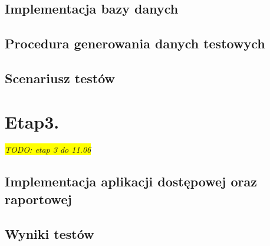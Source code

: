 \documentclass{article}
\newcommand{\todo}[1]{
	\colorbox{yellow} {{\color{red}
	\emph {TODO: #1}
}}}
\begin{document}
\subsection{Implementacja bazy danych}
\subsection{Procedura generowania danych testowych}
\subsection{Scenariusz testów}
\section{Etap3. \label{s3}}
\todo{etap 3 do 11.06}
\subsection{Implementacja aplikacji dostępowej oraz raportowej}
\subsection{Wyniki testów}
\end{document}
